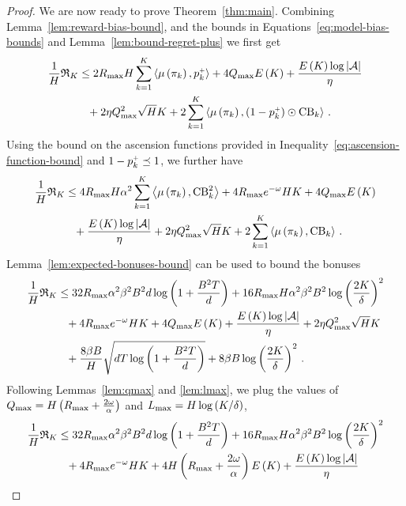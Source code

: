 \begin{proof}
    We are now ready to prove Theorem~\ref{thm:main}. Combining Lemma~\ref{lem:reward-bias-bound}, and the bounds in Equations~\eqref{eq:model-bias-bounds} and Lemma~\ref{lem:bound-regret-plus} we first get
    \begin{align*}
        \frac1H \mathfrak{R}_K &\leq 2 R_{\max} H \sum_{k=1}^K \left\langle \mu \left( \pi_k \right), p_k^{\mathsf{\scriptscriptstyle +}} \right\rangle + 4 Q_{\max} E \left( K \right) + \frac{E \left( K \right) \log \left|\mathcal{A}\right|}{\eta} \\
        &\phantom{=}+ 2 \eta Q_{\max}^2 \sqrt{H} K + 2 \sum_{k=1}^K \left\langle \mu \left( \pi_k \right), \left( 1 - p_k^{\mathsf{\scriptscriptstyle +}} \right) \odot \operatorname{CB}_k \right\rangle\,.
    \end{align*}
    Using the bound on the ascension functions provided in Inequality~\ref{eq:ascension-function-bound} and $1 - p_k^{\mathsf{\scriptscriptstyle +}} \preceq 1$, we further have
    \begin{align*}
        \frac1H \mathfrak{R}_K &\leq 4 R_{\max} H \alpha^2 \sum_{k=1}^K \left\langle \mu \left( \pi_k \right), \operatorname{CB}_k^2 \right\rangle + 4 R_{\max} e^{- \omega} H K + 4 Q_{\max} E \left( K \right) \\
        &\phantom{=}+ \frac{E \left( K \right) \log \left|\mathcal{A}\right|}{\eta} + 2 \eta Q_{\max}^2 \sqrt{H} K + 2 \sum_{k=1}^K \left\langle \mu \left( \pi_k \right), \operatorname{CB}_k \right\rangle\,.
    \end{align*}
    Lemma~\ref{lem:expected-bonuses-bound} can be used to bound the bonuses
    \begin{align*}
        \frac1H \mathfrak{R}_K &\leq 32 R_{\max} \alpha^2 \beta^2 B^2 d \log \left( 1 + \frac{B^2 T}{d} \right) + 16 R_{\max} H \alpha^2 \beta^2 B^2 \log \left( \frac{2 K}{\delta} \right)^2 \\
        &\phantom{=}+ 4 R_{\max} e^{- \omega} H K + 4 Q_{\max} E \left( K \right) + \frac{E \left( K \right) \log \left|\mathcal{A}\right|}{\eta} + 2 \eta Q_{\max}^2 \sqrt{H} K \\
        &\phantom{=}+ \frac{8 \beta B}{H} \sqrt{d T \log \left( 1 + \frac{B^2 T}{d} \right)} + 8 \beta B \log \left( \frac{2 K}{\delta} \right)^2\,.
    \end{align*}
    Following Lemmas~\ref{lem:qmax} and \ref{lem:lmax}, we plug the values of $Q_{\max} = H \left( R_{\max} + \frac{2 \omega}{\alpha} \right)$ and $L_{\max} = H \log \left( K / \delta \right)$,
    \begin{align*}
        \frac1H \regretK &\leq 32 \RMAX \alpha^2 \beta^2 B^2 d \log \spr{1 + \frac{B^2 T}{d}} + 16 \RMAX H \alpha^2 \beta^2 B^2 \log \spr{\frac{2 K}{\delta}}^2 \\
        &\phantom{=}+ 4 \RMAX e^{- \omega} H K + 4 H \spr{\RMAX + \frac{2 \omega}{\alpha}} E \spr{K} + \frac{E \spr{K} \log \abs{\cA}}{\eta} \\

\end{align*}
\end{proof}
